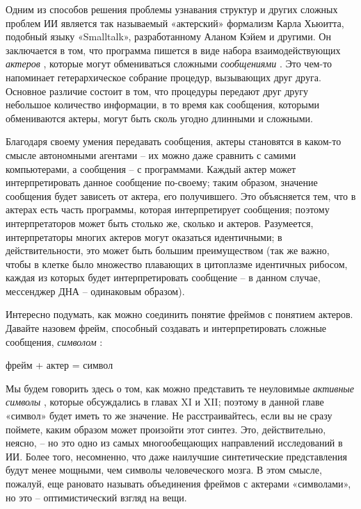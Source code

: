 \documentclass[../main.tex]{subfiles}
\begin{document}
Одним из способов решения проблемы узнавания структур и других сложных проблем ИИ является так называемый «актерский» формализм Карла Хьюитта, подобный языку «Smalltalk», разработанному Аланом Кэйем и другими. Он заключается в том, что программа пишется в виде набора взаимодействующих \emph{актеров} , которые могут обмениваться сложными \emph{сообщениями} . Это чем-то напоминает гетерархическое собрание процедур, вызывающих друг друга. Основное различие состоит в том, что процедуры передают друг другу небольшое количество информации, в то время как сообщения, которыми обмениваются актеры, могут быть сколь угодно длинными и сложными.

Благодаря своему умения передавать сообщения, актеры становятся в каком-то смысле автономными агентами \--- их можно даже сравнить с самими компьютерами, а сообщения \--- с программами. Каждый актер может интерпретировать данное сообщение по-своему; таким образом, значение сообщения будет зависеть от актера, его получившего. Это объясняется тем, что в актерах есть часть программы, которая интерпретирует сообщения; поэтому интерпретаторов может быть столько же, сколько и актеров. Разумеется, интерпретаторы многих актеров могут оказаться идентичными; в действительности, это может быть большим преимуществом (так же важно, чтобы в клетке было множество плавающих в цитоплазме идентичных рибосом, каждая из которых будет интерпретировать сообщение \--- в данном случае, мессенджер ДНА \--- одинаковым образом).

Интересно подумать, как можно соединить понятие фреймов с понятием актеров. Давайте назовем фрейм, способный создавать и интерпретировать сложные сообщения, \emph{символом} :

фрейм + актер = символ

Мы будем говорить здесь о том, как можно представить те неуловимые \emph{активные символы} , которые обсуждались в главах XI и XII; поэтому в данной главе «символ» будет иметь то же значение. Не расстраивайтесь, если вы не сразу поймете, каким образом может произойти этот синтез. Это, действительно, неясно, \--- но это одно из самых многообещающих направлений исследований в ИИ\@. Более того, несомненно, что даже наилучшие синтетические представления будут менее мощными, чем символы человеческого мозга. В этом смысле, пожалуй, еще рановато называть объединения фреймов с актерами «символами», но это \--- оптимистический взгляд на вещи.
\end{document}
